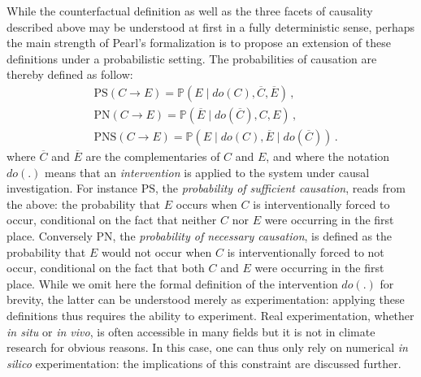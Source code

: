 \documentclass[12pt]{article}
\newcommand{\PN}{\textrm{PN}}
\newcommand{\DO}{do}
\newcommand{\PS}{\textrm{PS}}
\newcommand{\PNS}{\textrm{PNS}}
\newcommand{\Proba}{\mathbb P}
\begin{document}
While the counterfactual definition as well as the three facets of causality described above may be understood at first in a fully deterministic sense, perhaps the main strength of Pearl's formalization is to propose an extension of these definitions under a probabilistic setting. The probabilities of causation are thereby defined as follow:
\begin{subequations}\label{prob}
\begin{align}
& \PS(C\rightarrow E) = \Proba(E\mid \DO(C),\overline{C},\overline{E})\,, \\
& \PN(C\rightarrow E) = \Proba(\overline{E}\mid \DO(\overline{C}),C,E)\,, \\
& \PNS(C\rightarrow E) = \Proba(E\mid\DO(C),\overline{E}\mid \DO(\overline{C}))\,.
\end{align}
\end{subequations}
where $\overline{C}$ and $\overline{E}$ are the complementaries of $C$ and $E$, and where the notation $\DO(.)$ means that an \textit{intervention} is applied to the system under causal investigation. For instance $\PS$, the \textit{probability of sufficient causation}, reads from the above: the probability that $E$ occurs when $C$ is interventionally forced to occur, conditional on the fact that neither $C$ nor $E$ were occurring in the first place. Conversely $\PN$, the \textit{probability of necessary causation}, is defined as the probability that $E$ would not occur when $C$ is interventionally forced to not occur, conditional on the fact that both $C$ and $E$ were occurring in the first place. %
While we omit here the formal definition of the intervention $\DO(.)$ for brevity, the latter can be understood merely as experimentation: applying these definitions thus requires the ability to experiment. Real experimentation, whether \textit{in situ} or \textit{in vivo}, is often accessible in many fields but it is not in climate research for obvious reasons. In this case, one can thus only rely on numerical  \textit{in silico} experimentation:  the implications of this constraint are discussed further. 
\end{document}
